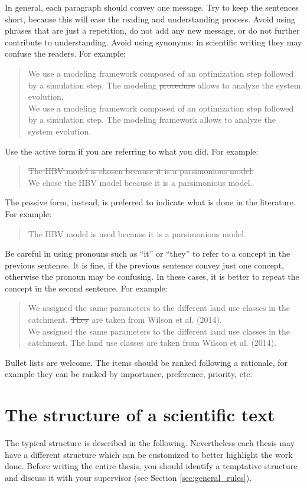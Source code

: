 In general, each paragraph should convey one message. 
Try to keep the sentences short, because this will ease the reading and understanding process.
Avoid using phrases that are just a repetition, do not add any new message, or do not further contribute to understanding.
Avoid using synonyms: in scientific writing they may confuse the readers. 
For example: \\
\blockquote{We use a modeling framework composed of an optimization step followed by a simulation step. The modeling \sout{procedure} allows to analyze the system evolution.\\
We use a modeling framework composed of an optimization step followed by a simulation step. The modeling framework allows to analyze the system evolution.}

Use the active form if you are referring to what you did.
For example:
\blockquote{\sout{The HBV model is chosen because it is a parsimonious model.}\\
We chose the HBV model because it is a parsimonious model.}
The passive form, instead, is preferred to indicate what is done in the literature.
For example:
\blockquote{The HBV model is used because it is a parsimonious model.}

Be careful in using pronouns such as “it” or “they” to refer to a concept in the previous sentence. 
It is fine, if the previous sentence convey just one concept, otherwise the pronoun may be confusing.
In these cases, it is better to repeat the concept in the second sentence.
For example:
\blockquote{We assigned the same parameters to the different land use classes in the catchment. \sout{They} are taken from Wilson et al. (2014).\\
We assigned the same parameters to the different land use classes in the catchment. The land use classes are taken from Wilson et al. (2014).}

Bullet lists are welcome.
The items should be ranked following a rationale, for example they can be ranked by importance, preference, priority, etc.

\section{The structure of a scientific text}\label{sec:structure}
The typical structure is described in the following.
Nevertheless each thesis may have a different structure which can be customized to better highlight the work done.
Before writing the entire thesis, you should identify a temptative structure and discuss it with your supervisor (see Section \ref{sec:general_rules}).

